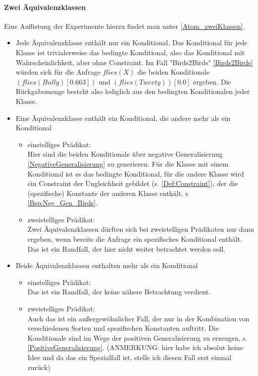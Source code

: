 \documentclass[a4paper, 11pt]{book}
\begin{document}
\paragraph{ Zwei Äquivalenzklassen}
Eine Auflistung der  Experimente hierzu findet man unter \ref{Atom_zweiKlassen}.
\begin{itemize}
\item Jede Äquivalenzklasse enthält nur ein Konditional. Das Konditional für jede Klasse ist trivialerweise das bedingte Konditional, also das Konditional mit Wahrscheinlichkeit, aber ohne Constraint. Im Fall "{}Birds2Birds"{} \ref{Birds2Birds} würden sich für die Anfrage $flies(X)$ die beiden Konditionale $ (flies(Bully)[0.663]) $ und $ (flies(Tweety))[0.0] $ ergeben. Die Rückgabemenge besteht also lediglich aus den bedingten Konditionalen jeder Klasse.
\item Eine Äquivalenzklasse enthält ein Konditional, die andere mehr als ein Konditional
\begin{itemize}
	\item einstelliges Prädikat:\\
	Hier sind die beiden Konditionale über negative Generalisierung \ref{NegativeGeneralisierung}  zu generieren. Für die Klasse mit einem Konditional ist es das bedingte Konditional, für die andere Klasse wird ein Constraint der Ungleichheit gebildet (s. \ref{Def:Constraint}), der die (spezifische) Konstante der anderen Klasse enthält, s \ref{Bsp:Neg_Gen_Birds}. 
	\item zweistelliges Prädikat:\\
	Zwei Äquivalenzklassen dürften sich bei zweistelligen Prädikaten nur dann ergeben, wenn bereits die Anfrage ein spezifisches Konditional enthält. Das ist ein Randfall, der hier nicht weiter betrachtet werden soll. 
\end{itemize}
\item Beide Äquivalenzklassen enthalten mehr als ein Konditional
\begin{itemize}
	\item {einstelliges Prädikat:}\\
	Das ist ein Randfall, der keine nähere Betrachtung verdient.
	\item zweistelliges Prädikat:\\
	Auch das ist ein außergewöhnlicher Fall, der nur in der Kombination von verschiedenen Sorten und spezifischen Konstanten auftritt. Die Konditionale sind im Wege der positiven Generalisierung zu erzeugen, s. \ref{PositiveGeneralisierung}.
	(ANMERKUNG: hier habe ich absolut keine Idee und da das ein Spezialfall ist, stelle ich diesen Fall erst einmal zurück)
\end{itemize}
\end{itemize}
\end{document}
